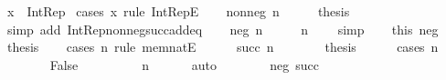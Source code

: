 \begin{isabellebody}
%
\isadelimproof
%
\endisadelimproof
%
\isatagproof
{}\isamarkupfalse%
\ {\isacartoucheopen}x\ {\isacharcolon}{\kern0pt}\ Int{\isacharunderscore}{\kern0pt}Rep{\isacartoucheclose}\isanewline
{}\isamarkupfalse%
\ {\isacharparenleft}{\kern0pt}cases\ x\ rule{\isacharcolon}{\kern0pt}\ Int{\isacharunderscore}{\kern0pt}RepE{\isacharparenright}{\kern0pt}\isanewline
\ \ \isamarkupfalse%
\ {\isacharparenleft}{\kern0pt}nonneg\ n{\isacharparenright}{\kern0pt}\isanewline
\ \ \isamarkupfalse%
\ \isamarkupfalse%
\ {\isacharquery}{\kern0pt}thesis\ \isamarkupfalse%
\ {\isacharparenleft}{\kern0pt}simp\ add{\isacharcolon}{\kern0pt}\ Int{\isacharunderscore}{\kern0pt}Rep{\isacharunderscore}{\kern0pt}nonneg{\isacharunderscore}{\kern0pt}succ{\isacharunderscore}{\kern0pt}add{\isacharunderscore}{\kern0pt}eq{\isacharparenright}{\kern0pt}\isanewline
{}\isamarkupfalse%
\isanewline
\ \ \isamarkupfalse%
\ {\isacharparenleft}{\kern0pt}neg\ n{\isacharparenright}{\kern0pt}\isanewline
\ \ \isamarkupfalse%
\ \isamarkupfalse%
\ {\isachardoublequoteopen}n\ {\isasymin}\ {\isasymnat}{\isachardoublequoteclose}\ \isamarkupfalse%
\ simp\isanewline
\ \ \isamarkupfalse%
\ this\ neg\ \isamarkupfalse%
\ {\isacharquery}{\kern0pt}thesis\isanewline
\ \ \isamarkupfalse%
\ {\isacharparenleft}{\kern0pt}cases\ n\ rule{\isacharcolon}{\kern0pt}\ mem{\isacharunderscore}{\kern0pt}natE{\isacharparenright}{\kern0pt}\isanewline
\ \ \ \ \isamarkupfalse%
\ {\isacharparenleft}{\kern0pt}succ\ n{\isacharparenright}{\kern0pt}\isanewline
\ \ \ \ \isamarkupfalse%
\ \isamarkupfalse%
\ {\isacharquery}{\kern0pt}thesis\isanewline
\ \ \ \ \isamarkupfalse%
\ {\isacharparenleft}{\kern0pt}cases\ {\isachardoublequoteopen}n\ {\isacharequal}{\kern0pt}\ {}{\isachardoublequoteclose}{\isacharparenright}{\kern0pt}\isanewline
\ \ \ \ \ \ \isamarkupfalse%
\ False\isanewline
\ \ \ \ \ \ \isamarkupfalse%
\ \isamarkupfalse%
\ {\isachardoublequoteopen}n\ {\isasymin}\ {\isacharparenleft}{\kern0pt}{\isasymnat}\ {\isasymsetminus}\ {\isacharbraceleft}{\kern0pt}{}{\isacharbraceright}{\kern0pt}{\isacharparenright}{\kern0pt}{\isachardoublequoteclose}\ \isamarkupfalse%
\ auto\isanewline
\ \ \ \ \ \ \isamarkupfalse%
\ neg\ succ\ \isamarkupfalse%

\end{isabellebody}
